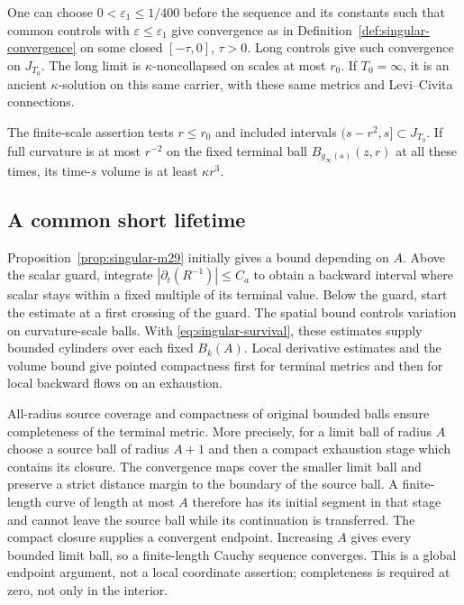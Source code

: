 \begin{theorem}
\label{thm:singular-m30}
One can choose $0<\varepsilon_1\leq1/400$ before the sequence and its
constants such that common controls with $\varepsilon\leq\varepsilon_1$
give convergence as in Definition~\ref{def:singular-convergence} on some
closed $[-\tau,0]$, $\tau>0$. Long controls give such convergence on
$J_{T_0}$. The long limit is $\kappa$-noncollapsed on scales at most
$r_0$. If $T_0=\infty$, it is an ancient $\kappa$-solution on this
same carrier, with these same metrics and Levi--Civita connections.
\end{theorem}

The finite-scale assertion tests $r\leq r_0$ and included intervals
$(s-r^2,s]\subset J_{T_0}$. If full curvature is at most $r^{-2}$ on
the fixed terminal ball $B_{g_\infty(s)}(z,r)$ at all these times, its
time-$s$ volume is at least $\kappa r^3$.

\subsection{A common short lifetime}

Proposition~\ref{prop:singular-m29} initially gives a bound depending on
$A$. Above the scalar guard, integrate
$|\partial_t(R^{-1})|\leq C_a$ to obtain a backward interval where
scalar stays within a fixed multiple of its terminal value. Below the
guard, start the estimate at a first crossing of the guard. The spatial
bound controls variation on curvature-scale balls. With
\eqref{eq:singular-survival}, these estimates supply bounded cylinders
over each fixed $B_k(A)$. Local derivative estimates and the volume bound
give pointed compactness first for terminal metrics and then for local
backward flows on an exhaustion.

All-radius source coverage and compactness of original bounded balls
ensure completeness of the terminal metric. More precisely, for a limit ball
of radius $A$ choose a source ball of radius $A+1$ and then a compact
exhaustion stage which contains its closure. The convergence maps cover the
smaller limit ball and preserve a strict distance margin to the boundary of
the source ball. A finite-length curve of length at most $A$ therefore has
its initial segment in that stage and cannot leave the source ball while its
continuation is transferred. The compact closure supplies a convergent
endpoint. Increasing $A$ gives every bounded limit ball, so a finite-length
Cauchy sequence converges. This is a global endpoint argument, not a local
coordinate assertion; completeness is required at zero, not only in the
interior.

